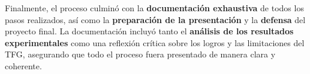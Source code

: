 Finalmente, el proceso culminó con la \textbf{documentación exhaustiva} de todos los pasos realizados, así como la
\textbf{preparación de la presentación} y la \textbf{defensa} del proyecto final.
La documentación incluyó tanto el \textbf{análisis de los resultados experimentales} como una reflexión crítica sobre
los logros y las limitaciones del TFG, asegurando que todo el proceso fuera presentado de manera clara y coherente.
\\[6pt]


